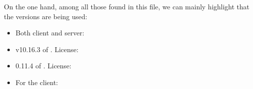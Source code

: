 \documentclass[letterpaper,10pt,english]{sphinxmanual}
\begin{document}
On the one hand, among all those found in this file, we can mainly highlight that the versions are being used:
\begin{itemize}
\item {} 
Both client and server:

\end{itemize}
\begin{itemize}
\item {} 
v10.16.3 of . License: 

\item {} 
0.11.4 of . License: 

\end{itemize}
\begin{itemize}
\item {} 
For the client:

\end{itemize}
\end{document}
